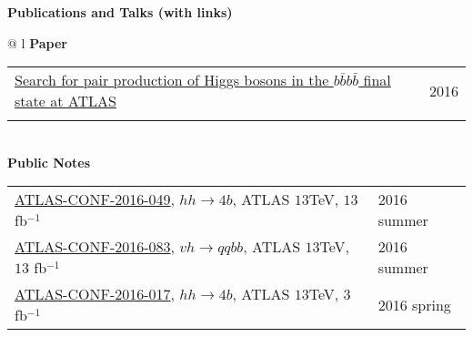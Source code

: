 \documentclass[letterpaper,11pt,oneside]{article}
\newcommand{\blue}[1]{\textcolor[rgb]{0,0,0.9}{#1}}
\begin{document}
\newpage
\raggedright
 \textbf{\Large{Publications and Talks (with links)}} \\
\vspace{-0.5cm}
\normalsize
\begin{flushleft}
\hspace{1cm}
 \begin{tabular}{@{} l}
    \textbf{Paper} \\ 
    \begin{tabular}{@{} l l }
    \blue{\href{http://arxiv.org/abs/1606.04782}{Search for pair production of Higgs bosons in the $b\bar{b}b\bar{b}$ final state at ATLAS}} & 2016 \\
    \hspace{0.8\linewidth} & \hspace{0.1\linewidth} \\
     \end{tabular}
     \\
    \textbf{Public Notes} \\ 
    \begin{tabular}{@{} l l }
    \blue{\href{https://atlas.web.cern.ch/Atlas/GROUPS/PHYSICS/CONFNOTES/ATLAS-CONF-2016-049/}{ATLAS-CONF-2016-049}}, $hh\to4b$, ATLAS $13$TeV, $13$ fb$^{-1}$ & 2016 summer\\
    \blue{\href{https://atlas.web.cern.ch/Atlas/GROUPS/PHYSICS/CONFNOTES/ATLAS-CONF-2016-083/}{ATLAS-CONF-2016-083}}, $vh\to qqbb$, ATLAS $13$TeV, $13$ fb$^{-1}$ & 2016 summer\\
    \blue{\href{https://atlas.web.cern.ch/Atlas/GROUPS/PHYSICS/CONFNOTES/ATLAS-CONF-2016-017/}{ATLAS-CONF-2016-017}}, $hh\to4b$, ATLAS $13$TeV, $3$ fb$^{-1}$ & 2016 spring\\
    

\end{tabular}
\end{tabular}
\end{flushleft}
\end{document}
